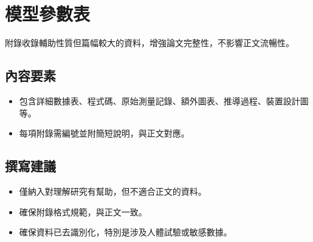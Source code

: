 \chapter{模型參數表}
附錄收錄輔助性質但篇幅較大的資料，增強論文完整性，不影響正文流暢性。

\section{內容要素}
\begin{itemize}
    \item 包含詳細數據表、程式碼、原始測量記錄、額外圖表、推導過程、裝置設計圖等。
   \item 每項附錄需編號並附簡短說明，與正文對應。
 
\end{itemize}

\section{撰寫建議}
\begin{itemize}
    \item 僅納入對理解研究有幫助，但不適合正文的資料。
   \item 確保附錄格式規範，與正文一致。
  \item 確保資料已去識別化，特別是涉及人體試驗或敏感數據。
\end{itemize}


